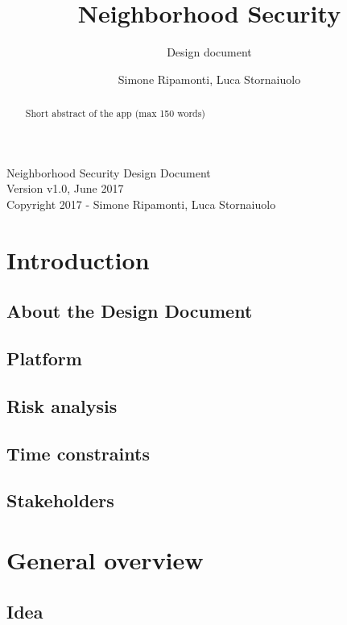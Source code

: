 \documentclass[a4paper]{scrreprt}
\title{ Neighborhood Security}
\subtitle{Design document}
\author{Simone Ripamonti, Luca Stornaiuolo}
\begin{document}
\maketitle

\null\vfill
\noindent
Neighborhood Security Design Document \\ 
Version v1.0, June 2017\\
Copyright 2017 - Simone Ripamonti, Luca Stornaiuolo\\
\newpage

\begin{abstract}
Short abstract of the app (max 150 words) 
\end{abstract}

\tableofcontents


\chapter{Introduction}

\section{About the Design Document}

\section{Platform}

\section{Risk analysis}

\section{Time constraints}

\section{Stakeholders}

\chapter{General overview}

\section{Idea}
\end{document}
